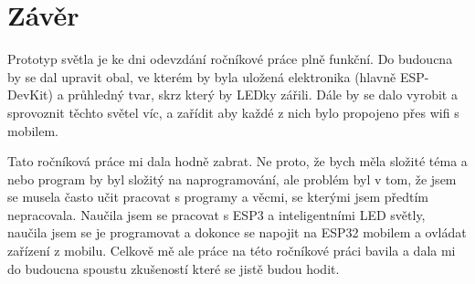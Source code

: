 \chapter*{Závěr}
Prototyp světla je ke dni odevzdání ročníkové práce plně funkční. Do budoucna by se dal upravit obal, ve kterém by byla uložená elektronika (hlavně ESP-DevKit) a průhledný tvar, skrz který by LEDky zářili. Dále by se dalo vyrobit a sprovoznit těchto světel víc, a zařídit aby každé z nich bylo propojeno přes wifi s mobilem.


Tato ročníková práce mi dala hodně zabrat. Ne proto, že bych měla složité téma a nebo program by byl složitý na naprogramování, ale problém byl v tom, že jsem se musela často učit pracovat s programy a věcmi, se kterými jsem předtím nepracovala. Naučila jsem se pracovat s ESP3 a inteligentními LED světly, naučila jsem se je programovat a dokonce se napojit na ESP32 mobilem a ovládat zařízení z mobilu.
Celkově mě ale práce na této ročníkové práci bavila a dala mi do budoucna spoustu zkušeností které se jistě budou hodit. 



\newpage